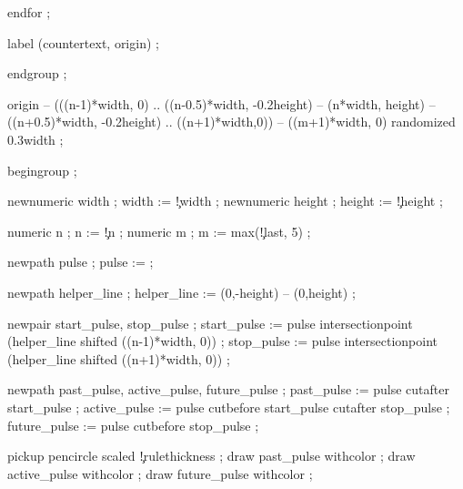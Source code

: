   endfor ;

  label (countertext, origin) ;

  endgroup ;

\stopuseMPgraphic



   origin -- (((n-1)*width, 0) .. ((n-0.5)*width, -0.2height) 
		  -- (n*width, height) -- ((n+0.5)*width, -0.2height) 
		  .. ((n+1)*width,0))  -- ((m+1)*width, 0) 
		  randomized 0.3width ;
\stopuseMPgraphic 


  begingroup ;

  newnumeric width  ; width  := \visualcounterparameter\c!width ;
  newnumeric height ; height := \visualcounterparameter\c!height ;

  numeric n ; n := \visualcounterparameter\c!n ;
  numeric m ; m := max(\visualcounterparameter\c!last, 5) ;


  newpath pulse ;
  pulse :=  ;

  newpath helper_line ;
  helper_line := (0,-height) -- (0,height) ;

  newpair start_pulse, stop_pulse ;
  start_pulse := pulse intersectionpoint (helper_line shifted ((n-1)*width, 0)) ;
  stop_pulse  := pulse intersectionpoint (helper_line shifted ((n+1)*width, 0)) ;

  
  newpath past_pulse, active_pulse, future_pulse ;
  past_pulse    := pulse cutafter start_pulse ;
  active_pulse  := pulse cutbefore start_pulse cutafter stop_pulse ;
  future_pulse  := pulse cutbefore stop_pulse ;

  pickup pencircle scaled \visualcounterparameter\c!rulethickness ;
  draw past_pulse   withcolor    ;
  draw active_pulse withcolor  ;
  draw future_pulse withcolor  ;

